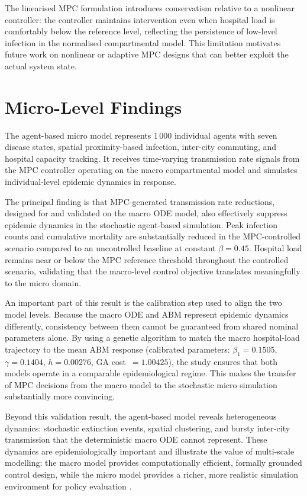 The linearised MPC formulation introduces conservatism relative to a nonlinear controller: the controller maintains intervention even when hospital load is comfortably below the reference level, reflecting the persistence of low-level infection in the normalised compartmental model.
This limitation motivates future work on nonlinear or adaptive MPC designs that can better exploit the actual system state.

\section{Micro-Level Findings}
\label{sec:conclusions_micro}

The agent-based micro model represents 1\,000 individual agents with seven disease states, spatial proximity-based infection, inter-city commuting, and hospital capacity tracking.
It receives time-varying transmission rate signals from the MPC controller operating on the macro compartmental model and simulates individual-level epidemic dynamics in response.

The principal finding is that MPC-generated transmission rate reductions, designed for and validated on the macro ODE model, also effectively suppress epidemic dynamics in the stochastic agent-based simulation.
Peak infection counts and cumulative mortality are substantially reduced in the MPC-controlled scenario compared to an uncontrolled baseline at constant $\beta = 0.45$.
Hospital load remains near or below the MPC reference threshold throughout the controlled scenario, validating that the macro-level control objective translates meaningfully to the micro domain.

An important part of this result is the calibration step used to align the two model levels.
Because the macro ODE and ABM represent epidemic dynamics differently, consistency between them cannot be guaranteed from shared nominal parameters alone.
By using a genetic algorithm to match the macro hospital-load trajectory to the mean ABM response (calibrated parameters: $\beta_1 = 0.1505$, $\gamma = 0.1404$, $h = 0.00276$, GA cost~$= 1.00425$), the study ensures that both models operate in a comparable epidemiological regime.
This makes the transfer of MPC decisions from the macro model to the stochastic micro simulation substantially more convincing.

Beyond this validation result, the agent-based model reveals heterogeneous dynamics: stochastic extinction events, spatial clustering, and bursty inter-city transmission that the deterministic macro ODE cannot represent.
These dynamics are epidemiologically important and illustrate the value of multi-scale modelling: the macro model provides computationally efficient, formally grounded control design, while the micro model provides a richer, more realistic simulation environment for policy evaluation \citep{polcz2025}.

